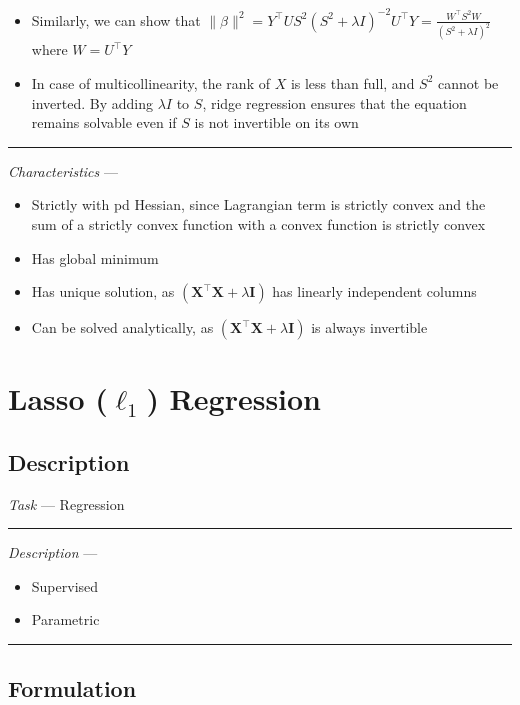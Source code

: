 \begin{itemize}
\begin{itemize}
\begin{itemize}
        \end{itemize}
        \item Similarly, we can show that $ \| \beta \|^2 = Y^\intercal US^2\left(S^2 + \lambda I\right)^{-2}U^\intercal Y = \frac{W^\intercal S^2 W}{(S^2 + \lambda I)^2}$ where $W = U^\intercal Y$
        \item In case of multicollinearity, the rank of $X$ is less than full, and $S^2$ cannot be inverted. By adding $\lambda I$ to $S$, ridge regression ensures that the equation remains solvable even if $S$ is not invertible on its own
    \end{itemize}
\end{itemize}

{\color{lightgray}\hrule height 0.001mm}

\emph{Characteristics} --- 
\begin{itemize}
    \item Strictly with pd Hessian, since Lagrangian term is strictly convex and the sum of a strictly convex function with a convex function is strictly convex
    \item Has global minimum
    \item Has unique solution, as $(\boldsymbol{X}^\intercal \boldsymbol{X} + \lambda \boldsymbol{I})$ has linearly independent columns
    \item Can be solved analytically, as $(\boldsymbol{X}^\intercal \boldsymbol{X} + \lambda \boldsymbol{I})$ is always invertible
\end{itemize}

\section{Lasso ($\ell_1$) Regression}
\subsection*{Description}
\emph{Task} --- Regression

{\color{lightgray}\hrule height 0.001mm}

\emph{Description} --- 
\begin{itemize}
    \item Supervised 
    \item Parametric
\end{itemize}

{\color{black}\hrule height 0.001mm}

\subsection*{Formulation}

